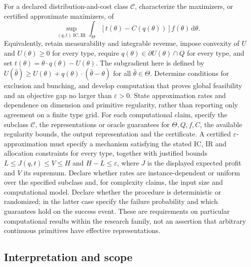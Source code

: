\documentclass[11pt,a4paper]{article}
\begin{document}
For a declared distribution-and-cost class $\mathcal C$, characterize the maximizers, or certified approximate maximizers, of
\[
\sup_{(q,t)\;\mathrm{IC,IR}}\int_\Theta[t(\theta)-C(q(\theta))]f(\theta)\,\mathrm d\theta.
\]
Equivalently, retain measurability and integrable revenue, impose convexity of $U$ and $U(\theta)\ge0$ for every type, require $q(\theta)\in\partial U(\theta)\cap Q$ for every type, and set $t(\theta)=\theta\cdot q(\theta)-U(\theta)$. The subgradient here is defined by $U(\hat\theta)\ge U(\theta)+q(\theta)\cdot(\hat\theta-\theta)$ for all $\hat\theta\in\Theta$. Determine conditions for exclusion and bunching, and develop computation that proves global feasibility and an objective gap no larger than $\varepsilon>0$. State approximation rates and dependence on dimension and primitive regularity, rather than reporting only agreement on a finite type grid. For each computational claim, specify the subclass $\mathcal C$, the representations or oracle guarantees for $\Theta,Q,f,C$, the available regularity bounds, the output representation and the certificate. A certified $\varepsilon$-approximation must specify a mechanism satisfying the stated IC, IR and allocation constraints for every type, together with justified bounds $L\le J(q,t)\le V\le H$ and $H-L\le\varepsilon$, where $J$ is the displayed expected profit and $V$ its supremum. Declare whether rates are instance-dependent or uniform over the specified subclass and, for complexity claims, the input size and computational model. Declare whether the procedure is deterministic or randomized; in the latter case specify the failure probability and which guarantees hold on the success event. These are requirements on particular computational results within the research family, not an assertion that arbitrary continuous primitives have effective representations.

\subsection*{Interpretation and scope}
\end{document}
